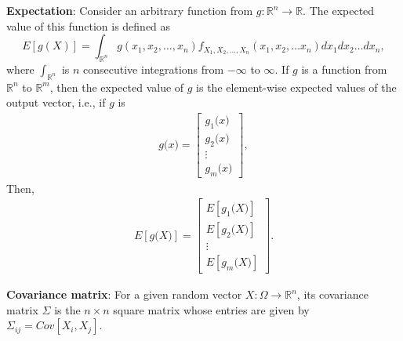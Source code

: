 \documentclass{article}
\begin{document}
\textbf{Expectation}:
Consider an
arbitrary function from $g:\mathbb{R}^n \rightarrow \mathbb{R} $. The expected value of this function is defined as
\begin{equation}
E[g(X)]=\int_{\mathbb{R}^n} g(x_1,x_2, \ldots, x_n)f_{X_1,X_2,\ldots,X_n} (x_1,x_2, \ldots x_n) dx_1 dx_2 \ldots dx_n,
\end{equation}
where $\int_{\mathbb{R}^n}$ is $n$ consecutive integrations from $-\infty$ to $\infty$. If $g$ is a function from $\mathbb{R}^n$ to $\mathbb{R}^m$, then the expected value of $g$ is the element-wise expected values of the output vector, i.e., if $g$ is
\begin{eqnarray*}
g\mathbf(x) =
\begin{bmatrix}
g_1\mathbf(x) \\
g_2\mathbf(x) \\
      \vdots\\
g_m\mathbf(x)
\end{bmatrix},
\end{eqnarray*}
Then,
\begin{eqnarray*}
E[g\mathbf(X)] =
\begin{bmatrix}
E[g_1\mathbf(X)] \\
E[g_2\mathbf(X)] \\
      \vdots\\
E[g_m\mathbf(X)]
\end{bmatrix}.
\end{eqnarray*}

\textbf{Covariance matrix}: For a given random vector
$X : \Omega \rightarrow \mathbb{R}^n$, its covariance matrix $\Sigma$
is the $n \times n$ square matrix whose entries are given by $\Sigma_{ij} =
Cov[X_i,X_j]$.  
\end{document}
